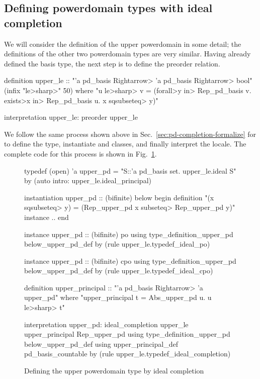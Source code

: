 \subsection{Defining powerdomain types with ideal completion}
\label{sec:pd-typedef}

We will consider the definition of the upper powerdomain in some detail; the definitions of the other two powerdomain types are very similar. Having already defined the basis type, the next step is to define the preorder relation.
%
\begin{isacode}
definition upper_le :: "'a pd_basis \<Rightarrow> 'a pd_basis \<Rightarrow> bool" (infix "\<le>\<sharp>" 50)
  where "u \<le>\<sharp> v = (\<forall>y \<in> Rep_pd_basis v. \<exists>x \<in> Rep_pd_basis u. x \<sqsubseteq> y)"
\end{isacode}
\unmedskip
\begin{isacode}
interpretation upper_le: preorder upper_le
\end{isacode}
%
We follow the same process shown above in Sec.~\ref{sec:pd-completion-formalize}
for  to define the type, instantiate  and  classes, and finally interpret the  locale. The complete code for this process is shown in Fig.~\ref{fig:pd-upper}.

\begin{figure}
\begin{isacode}
typedef (open) 'a upper_pd = "{S::'a pd_basis set. upper_le.ideal S}"
  by (auto intro: upper_le.ideal_principal)
\end{isacode}
\unmedskip
{}
\begin{isacode}
instantiation upper_pd :: (bifinite) below
begin
  definition "(x \<sqsubseteq> y) = (Rep_upper_pd x \<subseteq> Rep_upper_pd y)"
  instance ..
end
\end{isacode}
\unmedskip
\begin{isacode}
instance upper_pd :: (bifinite) po
  using type_definition_upper_pd below_upper_pd_def
  by (rule upper_le.typedef_ideal_po)
\end{isacode}
\unmedskip
\begin{isacode}
instance upper_pd :: (bifinite) cpo
  using type_definition_upper_pd below_upper_pd_def
  by (rule upper_le.typedef_ideal_cpo)
\end{isacode}
\unmedskip
\begin{isacode}
definition upper_principal :: "'a pd_basis \<Rightarrow> 'a upper_pd"
  where "upper_principal t = Abs_upper_pd {u. u \<le>\<sharp> t}"
\end{isacode}
\unmedskip
\begin{isacode}
interpretation upper_pd: ideal_completion upper_le upper_principal Rep_upper_pd
  using type_definition_upper_pd below_upper_pd_def
  using upper_principal_def pd_basis_countable
  by (rule upper_le.typedef_ideal_completion)
\end{isacode}
\caption{Defining the upper powerdomain type by ideal completion}
\label{fig:pd-upper}
\end{figure}

